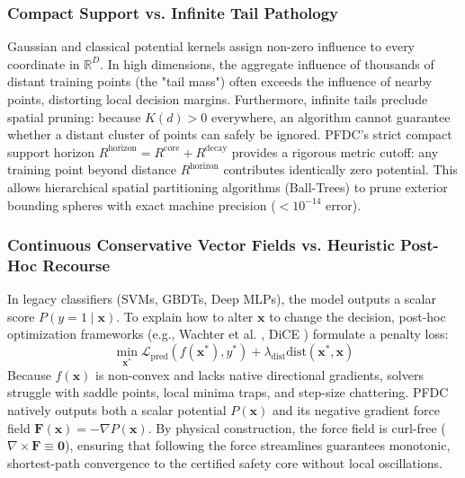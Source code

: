\documentclass[preprint,review,12pt]{elsarticle}
\begin{document}
\subsubsection{Compact Support vs. Infinite Tail Pathology}
Gaussian and classical potential kernels assign non-zero influence to every coordinate in $\mathbb{R}^D$. In high dimensions, the aggregate influence of thousands of distant training points (the "tail mass") often exceeds the influence of nearby points, distorting local decision margins. Furthermore, infinite tails preclude spatial pruning: because $K(d) > 0$ everywhere, an algorithm cannot guarantee whether a distant cluster of points can safely be ignored. PFDC's strict compact support horizon $R^{\mathrm{horizon}} = R^{\mathrm{core}} + R^{\mathrm{decay}}$ provides a rigorous metric cutoff: any training point beyond distance $R^{\mathrm{horizon}}$ contributes identically zero potential. This allows hierarchical spatial partitioning algorithms (Ball-Trees) to prune exterior bounding spheres with exact machine precision ($< 10^{-14}$ error).

\subsubsection{Continuous Conservative Vector Fields vs. Heuristic Post-Hoc Recourse}
In legacy classifiers (SVMs, GBDTs, Deep MLPs), the model outputs a scalar score $P(y=1 \mid \mathbf{x})$. To explain how to alter $\mathbf{x}$ to change the decision, post-hoc optimization frameworks (e.g., Wachter et al. \cite{wachter2017counterfactual}, DiCE \cite{mothilal2020explaining}) formulate a penalty loss:
\begin{equation}
    \min_{\mathbf{x}^*} \mathcal{L}_{\mathrm{pred}}(f(\mathbf{x}^*), y^*) + \lambda_{\mathrm{dist}} \mathrm{dist}(\mathbf{x}^*, \mathbf{x})
\end{equation}
Because $f(\mathbf{x})$ is non-convex and lacks native directional gradients, solvers struggle with saddle points, local minima traps, and step-size chattering. PFDC natively outputs both a scalar potential $P(\mathbf{x})$ and its negative gradient force field $\mathbf{F}(\mathbf{x}) = -\nabla P(\mathbf{x})$. By physical construction, the force field is curl-free ($\nabla \times \mathbf{F} \equiv \mathbf{0}$), ensuring that following the force streamlines guarantees monotonic, shortest-path convergence to the certified safety core without local oscillations.
\end{document}
